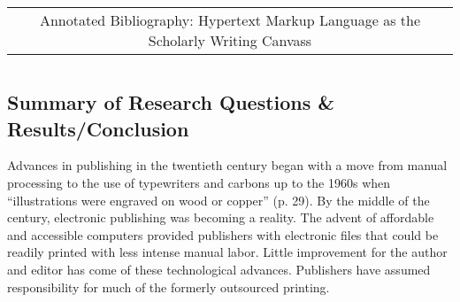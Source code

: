 \documentclass[leavefloats]{apa6e}\usepackage[]{graphicx}\usepackage[]{color}
\begin{document}
\newsavebox{\mytitle}
\begin{lrbox}{\mytitle}
\begin{tabular}{c}
  \normalfont Annotated Bibliography: Hypertext Markup Language as the Scholarly Writing Canvass
\end{tabular}
\end{lrbox}

\title{\usebox\mytitle}

\author{Tyler W. Rinker\\
University at Buffalo/SUNY \\ \raggedright \vspace{8cm} LAI 615: Introduction to Curriculum, Instruction, and Science of Learning \\ Annotated Bibliography \\
}
\date{\today}
\maketitle




\section{\textcite{Adams2002}}





\regpar



\subsection{Summary of Research Questions \& Results/Conclusion} %
Advances in publishing in the twentieth century began with a move from manual processing to the use of typewriters and carbons up to the 1960s when ``illustrations were engraved on wood or copper'' (p. 29).  By the middle of the century, electronic publishing was becoming a reality.  The advent of affordable and accessible computers provided publishers with electronic files that could be readily printed with less intense manual labor.  Little improvement for the author and editor has come of these technological advances.  Publishers have assumed responsibility for much of the formerly outsourced printing.
\end{document}
